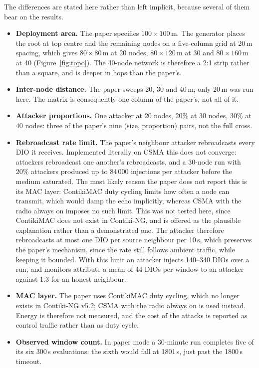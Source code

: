 \documentclass[11pt, a4paper]{article}
\begin{document}
The differences are stated here rather than left implicit, because several of them bear on the results.

\begin{itemize}
  \item \textbf{Deployment area.} The paper specifies $100\times100$\,m. The generator places the root at top centre and the remaining nodes on a five-column grid at 20\,m spacing, which gives $80\times80$\,m at 20 nodes, $80\times120$\,m at 30 and $80\times160$\,m at 40 (Figure~\ref{fig:topo}). The 40-node network is therefore a 2:1 strip rather than a square, and is deeper in hops than the paper's.
  \item \textbf{Inter-node distance.} The paper sweeps 20, 30 and 40\,m; only 20\,m was run here. The matrix is consequently one column of the paper's, not all of it.
  \item \textbf{Attacker proportions.} One attacker at 20 nodes, 20\% at 30 nodes, 30\% at 40 nodes: three of the paper's nine (size, proportion) pairs, not the full cross.
  \item \textbf{Rebroadcast rate limit.} The paper's neighbour attacker rebroadcasts every DIO it receives. Implemented literally on CSMA this does not converge: attackers rebroadcast one another's rebroadcasts, and a 30-node run with 20\% attackers produced up to 84\,000 injections per attacker before the medium saturated. The most likely reason the paper does not report this is its MAC layer: ContikiMAC duty cycling limits how often a node can transmit, which would damp the echo implicitly, whereas CSMA with the radio always on imposes no such limit. This was not tested here, since ContikiMAC does not exist in Contiki-NG, and is offered as the plausible explanation rather than a demonstrated one. The attacker therefore rebroadcasts at most one DIO per source neighbour per 10\,s, which preserves the paper's mechanism, since the rate still follows ambient traffic, while keeping it bounded. With this limit an attacker injects 140--340 DIOs over a run, and monitors attribute a mean of 44 DIOs per window to an attacker against 1.3 for an honest neighbour.
  \item \textbf{MAC layer.} The paper uses ContikiMAC duty cycling, which no longer exists in Contiki-NG v5.2; CSMA with the radio always on is used instead. Energy is therefore not measured, and the cost of the attacks is reported as control traffic rather than as duty cycle.
  \item \textbf{Observed window count.} In paper mode a 30-minute run completes five of its six 300\,s evaluations: the sixth would fall at 1801\,s, just past the 1800\,s timeout.
\end{itemize}
\end{document}
